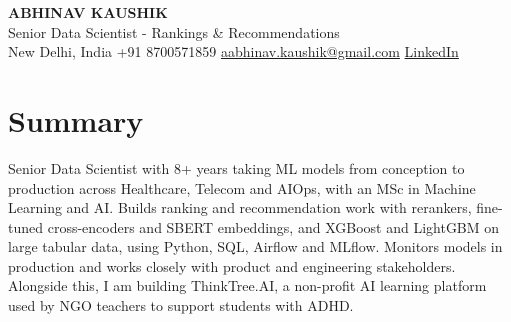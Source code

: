 \documentclass[10pt,a4paper]{article}
\begin{document}
\begin{center}
  {\LARGE\bfseries ABHINAV KAUSHIK}\\[2pt]
  {\large Senior Data Scientist - Rankings \& Recommendations}\\[2pt]
  New Delhi, India \textbar{} +91 8700571859 \textbar{} \href{mailto:aabhinav.kaushik@gmail.com}{aabhinav.kaushik@gmail.com} \textbar{} \href{https://www.linkedin.com/in/abhinav-kaushik10/}{LinkedIn}  
\end{center}

\section{Summary}
Senior Data Scientist with 8+ years taking ML models from conception to production across Healthcare, Telecom and AIOps, with an MSc in Machine Learning and AI. Builds ranking and recommendation work with rerankers, fine-tuned cross-encoders and SBERT embeddings, and XGBoost and LightGBM on large tabular data, using Python, SQL, Airflow and MLflow. Monitors models in production and works closely with product and engineering stakeholders. Alongside this, I am building ThinkTree.AI, a non-profit AI learning platform used by NGO teachers to support students with ADHD.
\end{document}
